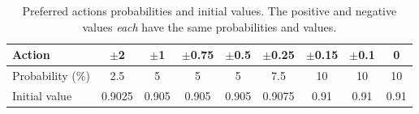 \begin{table}[htbp]
\footnotesize
\centering
\centerfloat
\begin{tabular}{@{}lcccccccc@{}}
\toprule
Action & $\pm$2 & $\pm$1     & $\pm$0.75  & $\pm$0.5   & $\pm$0.25  & $\pm$0.15  & $\pm$0.1   & 0 \\ \midrule
Probability (\%)  & 2.5   & 5 & 5 & 5 & 7.5   & 10 & 10 & 10 \\ \midrule 
Initial value  & 0.9025 & 0.905 & 0.905 & 0.905 & 0.9075   & 0.91 & 0.91 & 0.91 \\ \bottomrule
\end{tabular}
\caption[Preferred actions probabilities]{Preferred actions probabilities and initial values. The positive and negative values \emph{each} have the same probabilities and values.}
\label{tab:pref_actions}
\end{table} 